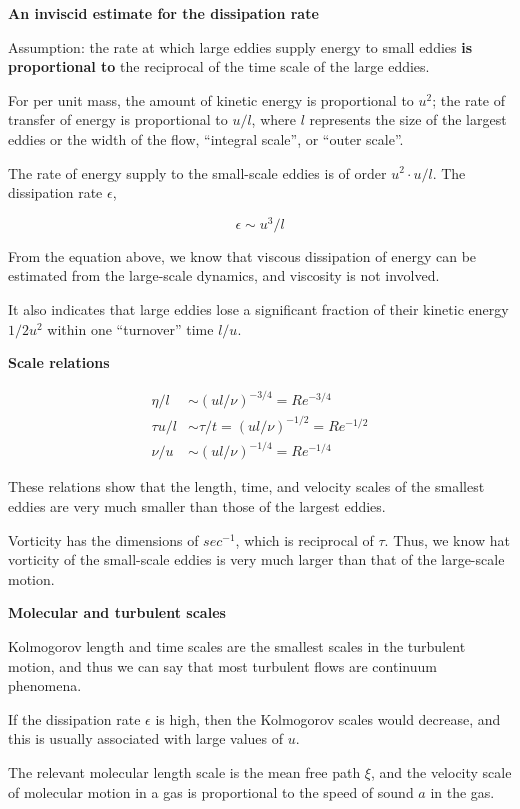 \documentclass{article}
\begin{document}
\textbf{An inviscid estimate for the dissipation rate}

Assumption: the rate at which large eddies supply energy to small eddies \textbf{is proportional to} the reciprocal of the time scale of the large eddies.

For per unit mass,  the amount of kinetic energy is proportional to $u^2$; the rate of transfer of energy is proportional to $u/l$, where $l$ represents the size of the largest eddies or the width of the flow, ``integral scale'', or ``outer scale''.

The rate of energy supply to the small-scale eddies is of order $u^2\cdot u/l$. The dissipation rate $\epsilon$,

\begin{equation*}
    \epsilon\sim u^3/l
\end{equation*}

From the equation above, we know that viscous dissipation of energy can be estimated from the large-scale dynamics, and viscosity is not involved.

It also indicates that large eddies lose a significant fraction of their kinetic energy $1/2u^2$ within one ``turnover'' time $l/u$.

\textbf{Scale relations}

\begin{align*}
    \eta/l&\sim(ul/\nu)^{-3/4}=Re^{-3/4}\\
    \tau u/l&\sim\tau/t=(ul/\nu)^{-1/2}=Re^{-1/2}\\
    \nu/u&\sim(ul/\nu)^{-1/4}=Re^{-1/4}
\end{align*}

These relations show that the length, time, and velocity scales of the smallest eddies are very much smaller than those of the largest eddies.

Vorticity has the dimensions of $sec^{-1}$, which is reciprocal of $\tau$. Thus, we know hat vorticity of the small-scale eddies is very much larger than that of the large-scale motion.

\textbf{Molecular and turbulent scales}

Kolmogorov length and time scales are the smallest scales in the turbulent motion, and thus we can say that most turbulent flows are continuum phenomena.

If the dissipation rate $\epsilon$ is high, then the Kolmogorov scales would decrease, and this is usually associated with large values of $u$.

The relevant molecular length scale is the mean free path $\xi$, and the velocity scale of molecular motion in a gas is proportional to the speed of sound $a$ in the gas.
\end{document}
